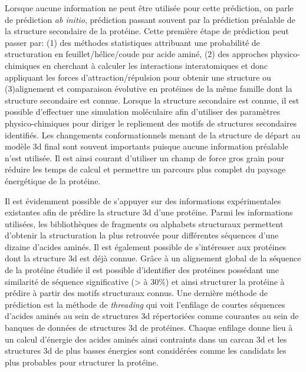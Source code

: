 Lorsque aucune information ne peut être utilisée pour cette prédiction, on parle de prédiction \textit{ab initio}, prédiction passant souvent par la prédiction préalable de la structure secondaire de la protéine. Cette première étape de prédiction peut passer par: (1) des méthodes statistiques attribuant une probabilité de structuration en feuillet/hélice/coude par acide aminé, (2) des approches physico-chimiques en cherchant à calculer les interactions interatomiques et donc appliquant les forces d'attraction/répulsion pour obtenir une structure ou (3)alignement et comparaison évolutive en protéines de la même famille dont la structure secondaire est connue.
Lorsque la structure secondaire est connue, il est possible d'effectuer une simulation moléculaire afin d'utiliser des paramètres physico-chimiques pour diriger le repliement des motifs de structures secondaires identifiés. Les changements conformationnels menant de la structure de départ au modèle 3d final sont souvent importants puisque aucune information préalable n'est utilisée. Il est ainsi courant d'utiliser un champ de force gros grain pour réduire les temps de calcul et permettre un parcours plus complet du paysage énergétique de la protéine. 

Il est évidemment possible de s'appuyer sur des informations expérimentales existantes afin de prédire la structure 3d d'une protéine. Parmi les informations utilisées, les bibliothèques de fragments ou alphabets structuraux permettent d'obtenir la structuration la plus retrouvée pour différentes séquences d'une dizaine d'acides aminés. 
Il est également possible de s'intéresser aux protéines dont la structure 3d est déjà connue. Grâce à un alignement global de la séquence de la protéine étudiée il est possible d'identifier des protéines possédant une similarité de séquence significative (> à 30\%) et ainsi structurer la protéine à prédire à partir des motifs structuraux connus.
Une dernière méthode de prédiction est la méthode de \textit{threading} qui voit l'enfilage de courtes séquences d'acides aminés au sein de structures 3d répertoriées comme courantes au sein de banques de données de structures 3d de protéines. Chaque enfilage donne lieu à un calcul d'énergie des acides aminés ainsi contraints dans un carcan 3d et les structures 3d de plus basses énergies sont considérées comme les candidats les plus probables pour structurer la protéine.


